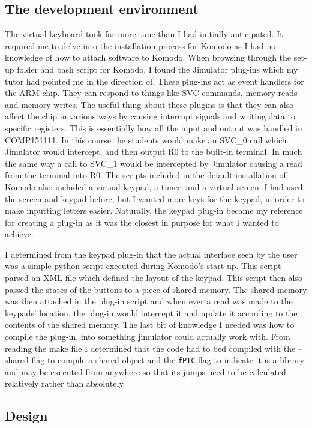 \label{chap:virtualKeyboard}
\subsection{The development environment}
The virtual keyboard took far more time than I had initially anticipated. It required me to delve into the installation process for Komodo as I had no knowledge of how to attach software to Komodo. When browsing through the set-up folder and bash script for Komodo, I found the Jimulator plug-ins which my tutor had pointed me in the direction of. These plug-ins act as event handlers for the ARM chip. They can respond to things like SVC commands, memory reads and memory writes. The useful thing about these plugins is that they can also affect the chip in various ways by causing interrupt signals and writing data to specific registers. This is essentially how all the input and output was handled in COMP151111. In this course the students would make an SVC\_0 call which Jimulator would intercept, and then output R0 to the built-in terminal. In much the same way a call to SVC\_1 would be intercepted by Jimulator causing a read from the terminal into R0. The scripts included in the default installation of Komodo also included a virtual keypad, a timer, and a virtual screen. I had used the screen and keypad before, but I wanted more keys for the keypad, in order to make inputting letters easier. Naturally, the keypad plug-in became my reference for creating a plug-in as it was the closest in purpose for what I wanted to achieve. 

I determined from the keypad plug-in that the actual interface seen by the user was a simple python script executed during Komodo's start-up. This script parsed an XML file which defined the layout of the keypad. This script then also passed the states of the buttons to a piece of shared memory. The shared memory was then attached in the plug-in script and when ever a read was made to the keypads' location, the plug-in would intercept it and update it according to the contents of the shared memory. The last bit of knowledge I needed was how to compile the plug-in, into something jimulator could actually work with. From reading the make file I determined that the code had to bed compiled with the --shared flag to compile a shared object and the \verb|fPIC| flag to indicate it is a library and may be executed from anywhere so that its jumps need to be calculated relatively rather than absolutely.
\subsection{Design}
